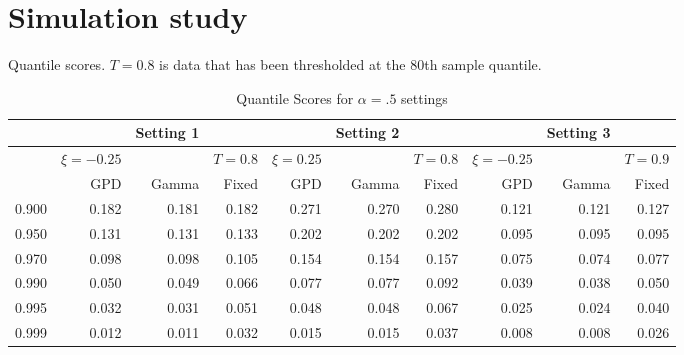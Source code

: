 \documentclass[11pt]{article}
\begin{document}
\section{Simulation study}\label{s:sim}
Quantile scores. $T=0.8$ is data that has been thresholded at the 80th sample quantile.
\begin{table}[htdp]
\caption{Quantile Scores for $\alpha=.5$ settings}
\begin{center}
\begin{tabular}{r|rrr|rrr|rrr|}
	\hline
	&&	Setting 1&	&	&Setting 2	&	&	&Setting 3	&	\\
	\hline
	&$\xi=-0.25$	&	&$T=0.8$& $\xi=0.25$ & & $T=0.8$& $\xi=-0.25$&&$T=0.9$\\
	\hline
	&GPD& Gamma & Fixed & GPD & Gamma & Fixed & GPD &Gamma & Fixed\\
	\hline
	0.900 & 0.182 & 0.181 & 0.182	&0.271 & 0.270 & 0.280	& 0.121 & 0.121 & 0.127\\
	\hline
	0.950 & 0.131 & 0.131 & 0.133	&0.202 & 0.202 & 0.202	& 0.095 & 0.095 & 0.095\\
	\hline
	0.970	&	0.098	&	0.098	&	0.105	&	0.154	&	0.154	&	0.157	&	0.075	&	0.074	&	0.077\\
	\hline
0.990	&	0.050	&	0.049	&	0.066	&	0.077	&	0.077	&	0.092	&	0.039	&	0.038	&	0.050\\
	\hline
0.995	&	0.032	&	0.031	&	0.051	&	0.048	&	0.048	&	0.067	&	0.025	&	0.024	&	0.040\\
	\hline
0.999	&	0.012	&	0.011	&	0.032	&	0.015	&	0.015	&	0.037	&	0.008	&	0.008	&	0.026\\
	\hline
\end{tabular}
\end{center}
\label{lbl:quantsim5}
\end{table}%
\end{document}
